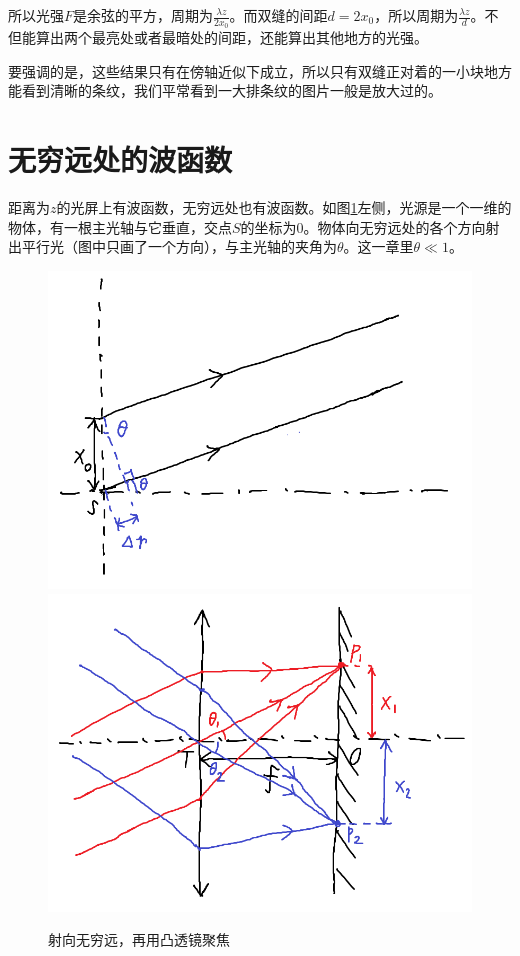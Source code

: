 所以光强$F$是余弦的平方，周期为$\frac{\lambda z}{2 x_0}$。而双缝的间距$d=2 x_0$，所以周期为$\frac{\lambda z}{d}$。不但能算出两个最亮处或者最暗处的间距，还能算出其他地方的光强。

要强调的是，这些结果只有在傍轴近似下成立，所以只有双缝正对着的一小块地方能看到清晰的条纹，我们平常看到一大排条纹的图片一般是放大过的。
\section{无穷远处的波函数}
距离为$z$的光屏上有波函数，无穷远处也有波函数。如图\ref{fig-wave-amp-inf}左侧，光源是一个一维的物体，有一根主光轴与它垂直，交点$S$的坐标为$0$。物体向无穷远处的各个方向射出平行光（图中只画了一个方向），与主光轴的夹角为$\theta$。这一章里$\theta \ll 1$。
\begin{figure}[htb]
\centering
\includegraphics[scale=0.5]{fig/wave-amp-inf.png}
\includegraphics[scale=0.5]{fig/conv-lens.png}
\caption{射向无穷远，再用凸透镜聚焦}
\label{fig-wave-amp-inf}
\end{figure}

